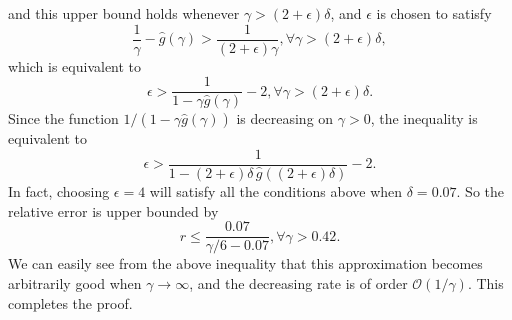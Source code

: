 \documentclass[12pt,draftclsnofoot,journal,onecolumn]{IEEEtran}
\theoremstyle{nonumberplain}
\begin{document}
    and this upper bound holds whenever $\gamma > (2+\epsilon)\delta$, and $\epsilon$ is chosen to satisfy 
    \begin{equation}
        \frac{1}{\gamma} - \hat{g}(\gamma) > \frac{1}{(2+\epsilon)\gamma}, \forall \gamma > (2+\epsilon)\delta,
    \end{equation}
    which is equivalent to 
    \begin{equation}
        \epsilon > \frac{1}{1-\gamma \hat{g}(\gamma)}-2, \forall \gamma > (2+\epsilon)\delta.
    \end{equation}
    Since the function $ 1/(1-\gamma \hat{g}(\gamma))$ is decreasing on $\gamma>0$, the inequality is equivalent to 
    \begin{equation}
        \epsilon > \frac{1}{1-(2+\epsilon)\delta\, \hat{g}((2+\epsilon)\delta)}-2.
    \end{equation}
    In fact, choosing $\epsilon=4$ will satisfy all the conditions above when $\delta = 0.07$. So the relative error is upper bounded by 
    \begin{equation}
        r \leq \frac{0.07}{\gamma/6 - 0.07}, \forall \gamma > 0.42.
    \end{equation}
    We can easily see from the above inequality that this approximation becomes arbitrarily good when $\gamma\to\infty$, and the decreasing rate is of order $\mathcal{O}(1/\gamma)$. This completes the proof. 

\footnotesize
\balance 


\end{document}
